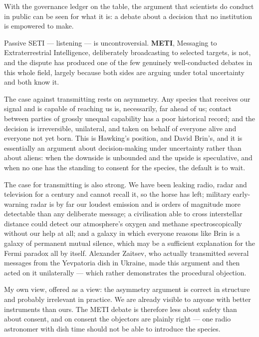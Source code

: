 With the governance ledger on the table, the argument that scientists do conduct in public can be
seen for what it is: a debate about a decision that no institution is empowered to make.


Passive SETI --- listening --- is uncontroversial. \textbf{METI}, Messaging to Extraterrestrial
Intelligence, deliberately broadcasting to selected targets, is not, and the dispute has produced one
of the few genuinely well-conducted debates in this whole field, largely because both sides are
arguing under total uncertainty and both know it.

The case against transmitting rests on asymmetry. Any species that receives our signal and is capable
of reaching us is, necessarily, far ahead of us; contact between parties of grossly unequal capability
has a poor historical record; and the decision is irreversible, unilateral, and taken on behalf of
everyone alive and everyone not yet born. This is Hawking's position, and David Brin's, and it is
essentially an argument about decision-making under uncertainty rather than about aliens: when the
downside is unbounded and the upside is speculative, and when no one has the standing to consent for
the species, the default is to wait.

The case for transmitting is also strong. We have been leaking radio, radar and television for a
century and cannot recall it, so the horse has left; military early-warning radar is by far our
loudest emission and is orders of magnitude more detectable than any deliberate message; a
civilisation able to cross interstellar distance could detect our atmosphere's oxygen and methane
spectroscopically without our help at all; and a galaxy in which everyone reasons like Brin is a
galaxy of permanent mutual silence, which may be a sufficient explanation for the Fermi paradox all
by itself. Alexander Zaitsev, who actually transmitted several messages from the Yevpatoria dish in
Ukraine, made this argument and then acted on it unilaterally --- which rather demonstrates the
procedural objection.

My own view, offered as a view: the asymmetry argument is correct in structure and probably
irrelevant in practice. We are already visible to anyone with better instruments than ours. The
METI debate is therefore less about safety than about consent, and on consent the objectors are
plainly right --- one radio astronomer with dish time should not be able to introduce the species.

